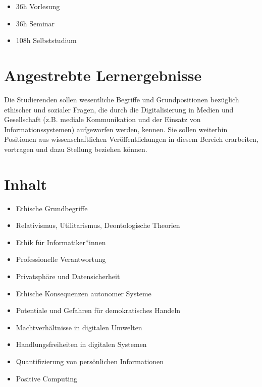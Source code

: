 \begin{itemize}
\tightlist
\item
  36h Vorlesung
\item
  36h Seminar
\item
  108h Selbststudium
\end{itemize}

\section*{Angestrebte
Lernergebnisse\label{/mi-2017/modulbeschreibungen-master/MA_All_Computerethik}}\label{angestrebte-lernergebnissepathlabelmi-2017modulbeschreibungen-mastermaux5fallux5fcomputerethik}

Die Studierenden sollen wesentliche Begriffe und Grundpositionen
bezüglich ethischer und sozialer Fragen, die durch die Digitalisierung
in Medien und Gesellschaft (z.B. mediale Kommunikation und der Einsatz
von Informationssystemen) aufgeworfen werden, kennen. Sie sollen
weiterhin Positionen aus wissenschaftlichen Veröffentlichungen in diesem
Bereich erarbeiten, vortragen und dazu Stellung beziehen können.

\section*{Inhalt\label{/mi-2017/modulbeschreibungen-master/MA_All_Computerethik}}\label{inhaltpathlabelmi-2017modulbeschreibungen-mastermaux5fallux5fcomputerethik}

\begin{itemize}
\tightlist
\item
  Ethische Grundbegriffe
\item
  Relativismus, Utilitarismus, Deontologische Theorien
\item
  Ethik für Informatiker*innen
\item
  Professionelle Verantwortung
\item
  Privatsphäre und Datensicherheit
\item
  Ethische Konsequenzen autonomer Systeme
\item
  Potentiale und Gefahren für demokratisches Handeln
\item
  Machtverhältnisse in digitalen Umwelten
\item
  Handlungsfreiheiten in digitalen Systemen
\item
  Quantifizierung von persönlichen Informationen
\item
  Positive Computing
\end{itemize}

